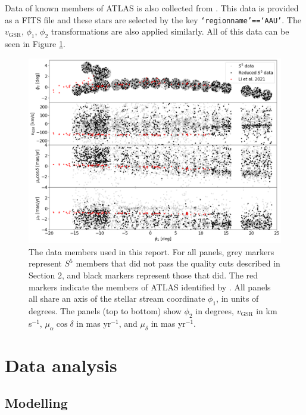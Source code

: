 \documentclass{article}
\begin{document}
Data of known members of ATLAS is also collected from \citet{2021ApJ...911..149L}. This data is provided as a FITS file and these stars are selected by the key \texttt{`regionname'==`AAU'}. The $v_\text{GSR}$, $\phi_1$, $\phi_2$ transformations are also applied similarly. All of this data can be seen in Figure \ref{fig:1}.

\begin{figure}[H]
\begin{center}
    \includegraphics[width=\textwidth]{figures/fig 1.png}
\end{center}
    \vspace{-2em}
    \caption{The data members used in this report. For all panels, grey markers represent $S^5$ members that did not pass the quality cuts described in Section 2, and black markers represent those that did. The red markers indicate the members of ATLAS identified by \citet{2021ApJ...911..149L}. All panels all share an axis of the stellar stream coordinate $\phi_1$, in units of degrees. The panels (top to bottom) show $\phi_2$ in degrees, $v_\text{GSR}$ in km s$^{-1}$, $\mu_\alpha\cos\delta$ in mas yr$^{-1}$, and $\mu_\delta$ in mas yr$^{-1}$.}
    \label{fig:1}
\end{figure}

\section{Data analysis}

\subsection{Modelling}
\end{document}
